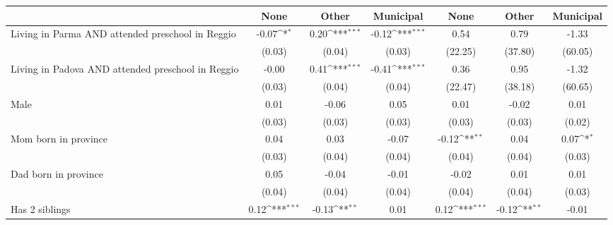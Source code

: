 {
\def\sym#1{\ifmmode^{#1}\else\(^{#1}\)\fi}
\begin{tabular}{l*{6}{c}}
\toprule
                    &\multicolumn{1}{c}{None}&\multicolumn{1}{c}{Other}&\multicolumn{1}{c}{Municipal}&\multicolumn{1}{c}{None}&\multicolumn{1}{c}{Other}&\multicolumn{1}{c}{Municipal}\\
\midrule
Living in Parma AND attended preschool in Reggio&       -0.07\sym{*}  &        0.20\sym{***}&       -0.12\sym{***}&        0.54         &        0.79         &       -1.33         \\
                    &      (0.03)         &      (0.04)         &      (0.03)         &     (22.25)         &     (37.80)         &     (60.05)         \\
\addlinespace
Living in Padova AND attended preschool in Reggio&       -0.00         &        0.41\sym{***}&       -0.41\sym{***}&        0.36         &        0.95         &       -1.32         \\
                    &      (0.03)         &      (0.04)         &      (0.04)         &     (22.47)         &     (38.18)         &     (60.65)         \\
\addlinespace
Male                &        0.01         &       -0.06         &        0.05         &        0.01         &       -0.02         &        0.01         \\
                    &      (0.03)         &      (0.03)         &      (0.03)         &      (0.03)         &      (0.03)         &      (0.02)         \\
\addlinespace
Mom born in province&        0.04         &        0.03         &       -0.07         &       -0.12\sym{**} &        0.04         &        0.07\sym{*}  \\
                    &      (0.03)         &      (0.04)         &      (0.04)         &      (0.04)         &      (0.04)         &      (0.03)         \\
\addlinespace
Dad born in province&        0.05         &       -0.04         &       -0.01         &       -0.02         &        0.01         &        0.01         \\
                    &      (0.04)         &      (0.04)         &      (0.04)         &      (0.04)         &      (0.04)         &      (0.03)         \\
\addlinespace
Has 2 siblings      &        0.12\sym{***}&       -0.13\sym{**} &        0.01         &        0.12\sym{***}&       -0.12\sym{**} &       -0.01         \\

\end{tabular}}
